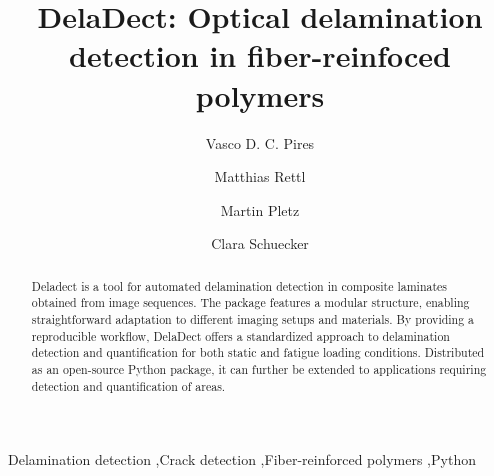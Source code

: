 \documentclass[final,5p,times]{elsarticle}
\begin{document}
	\renewcommand{\labelenumii}{\arabic{enumi}.\arabic{enumii}}
	
	\begin{frontmatter}
		
		
		
		\title{DelaDect: Optical delamination detection in fiber-reinfoced polymers}
		
		
		\author[label1]{Vasco D. C. Pires}
		\author[label2]{Matthias Rettl}
		\author[label1]{Martin Pletz }
		\author{Clara Schuecker  }
		\address[label1]{Chair of Designing Plastics and Composite Materials, Department of Polymer Engineering and Science, Technical University of Leoben, Austria}
		\address[label2]{Materials Center Leoben Forschung GmbH, Austria}
		
		
		\begin{abstract}
			Deladect is a tool for automated delamination detection in composite laminates obtained from image sequences.
			The package features a modular structure, enabling straightforward adaptation to different imaging setups and materials. By providing a reproducible workflow, DelaDect offers a standardized approach to delamination detection and quantification for both static and fatigue loading conditions. Distributed as an open-source Python package, it can further be extended to applications requiring detection and quantification of areas.
		\end{abstract}
		
		\begin{keyword}
			Delamination detection \sep Crack detection \sep Fiber-reinforced polymers \sep Python
			
			
			
		\end{keyword}
		
	\end{frontmatter}
	
\end{document}
